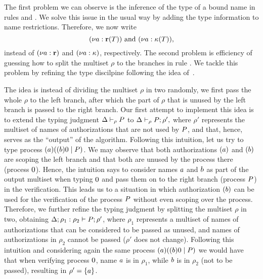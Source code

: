 The first problem we can observe is the inference of the type of a bound name in rules  and . We solve this issue in the usual way by adding the type information to name restrictions.
%
Therefore, we now write 
\[
  {(\nu a :{\mathbf{r}}(T))\text{ and }(\nu a : {\mathbf{\kappa}}(T)),}
\] 
 instead of $(\nu a :{\mathbf{r}})$ and $(\nu a : {\mathbf{\kappa}})$, respectively.
%
The second problem is efficiency of guessing how to split the multiset $\rho$ to the branches in rule . %
We tackle this problem by refining the type discilpine following the idea of~\cite{DBLP:journals/iandc/Vasconcelos12}. %

The idea is instead of dividing the multiset $\rho$ in two randomly, 
we first pass the whole $\rho$ to the left branch, after which the part of $\rho$ that is unused by the left branch is passed to the right branch.
Our first attempt to implement this idea is to  extend  
the typing judgment $\Delta \vdash_\rho P$ to 
$\Delta \vdash_\rho P ; \rho',$ where  $\rho'$ represents the multiset of names of authorizations that are not used by $P$, and that, hence, serves as  the ``output'' of the algorithm. 
Following this intuition, let us try to type process $(a)((b) 0 \;|\; P)$.
We may observe that both authorizations $(a)$ and $(b)$ are scoping the left branch 
and that both are unused by the process there (process $0$).  Hence, the intuition says to consider
names $a$ and $b$ as part of the output multiset when typing $0$ and pass them on to
the right branch (process $P$) in the verification. This leads us to a situation in which authorization $(b)$ can be used for the verification of the process $P$ without even scoping over the process.
Therefore, we further refine the typing judgment by splitting the multiset $\rho$ in two, obtaining 
$\Delta; \rho_1:\rho_2\vdash P ; \rho'$,
where $\rho_1$ represents a multiset of names of authorizations that can be considered to be passed as unused, and names of authorizations in $\rho_2$ cannot be passed ($\rho'$ does not change). 
Following this intuition and considering again the same process $(a)((b) 0 \;|\; P)$ 
we would have that when verifying process $0$, 
name $a$ is in $\rho_1$, while $b$ is in $\rho_2$ (not to be passed), resulting in $\rho'=\{a\}$.

